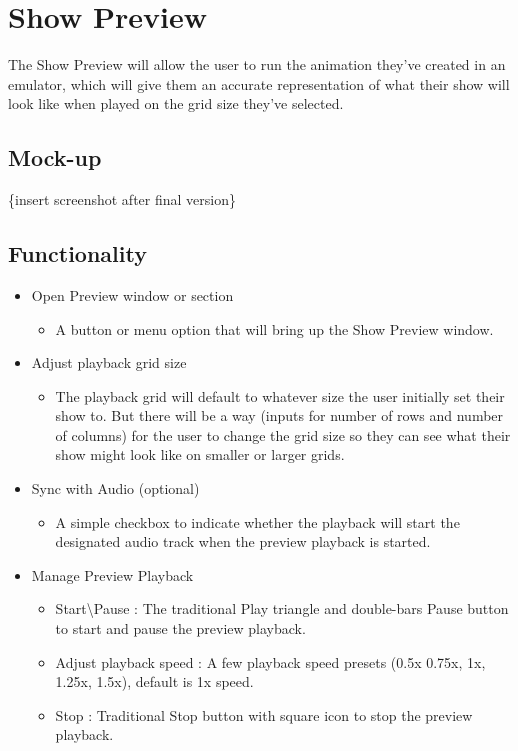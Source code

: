 \documentclass{article}
\begin{document}
	\section{Show Preview}
        The Show Preview will allow the user to run the animation they've created in an emulator, which will give them an accurate representation of what their show will look like when played on the grid size they've selected.
	\subsection{Mock-up}
	   \{insert screenshot after final version\}
	\subsection{Functionality}
	\begin{itemize}
		\item Open Preview window or section 
		\begin{itemize}
		    \item A button or menu option that will bring up the Show Preview window.
		\end{itemize}
		\item Adjust playback grid size
		\begin{itemize}
		    \item The playback grid will default to whatever size the user initially set their show to. But there will be a way (inputs for number of rows and number of columns) for the user to change the grid size so they can see what their show might look like on smaller or larger grids.
		\end{itemize}
		\item Sync with Audio (optional)
		\begin{itemize}
			\item A simple checkbox to indicate whether the playback will start the designated audio track when the preview playback is started. 
		\end{itemize}
		\item Manage Preview Playback
		 \begin{itemize}
		     \item Start\textbackslash Pause : The traditional Play triangle and double-bars Pause button to start and pause the preview playback.
		     \item Adjust playback speed : A few playback speed presets (0.5x 0.75x, 1x, 1.25x, 1.5x), default is 1x speed.
		     \item Stop : Traditional Stop button with square icon to stop the preview playback.
		 \end{itemize}
	\end{itemize}
	
\end{document}
